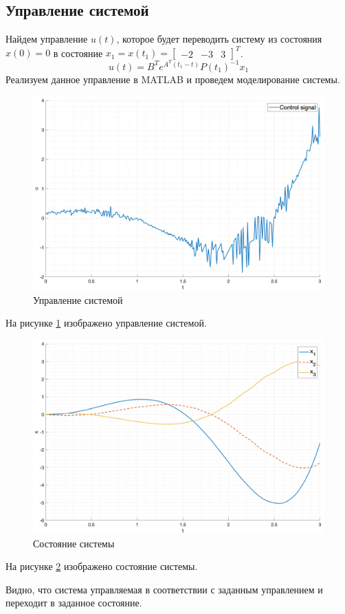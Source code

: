 \subsection{Управление системой}
Найдем управление $u(t)$, которое будет переводить систему из состояния $x(0) = 0$ в состояние $x_1 = x(t_1) = \begin{bmatrix} -2 & -3 & 3 \end{bmatrix}^T$. 
\begin{equation}
    u(t) = B^Te^{A^T(t_1 - t)}P(t_1)^{-1}x_1
\end{equation}
Реализуем данное управление в MATLAB и проведем моделирование системы. 
\begin{figure}
    \centering
    \includegraphics[width=\textwidth]{media/plots/task1_control_signal.png}
    \caption{Управление системой}
    \label{fig:task1_control_signal}
\end{figure}
На рисунке \ref{fig:task1_control_signal} изображено управление системой.
\begin{figure}
    \centering
    \includegraphics[width=\textwidth]{media/plots/task1_states.png}
    \caption{Состояние системы}
    \label{fig:task1_state}
\end{figure}
На рисунке \ref{fig:task1_state} изображено состояние системы.

Видно, что система управляемая в соответствии с заданным управлением и переходит в заданное состояние. 

